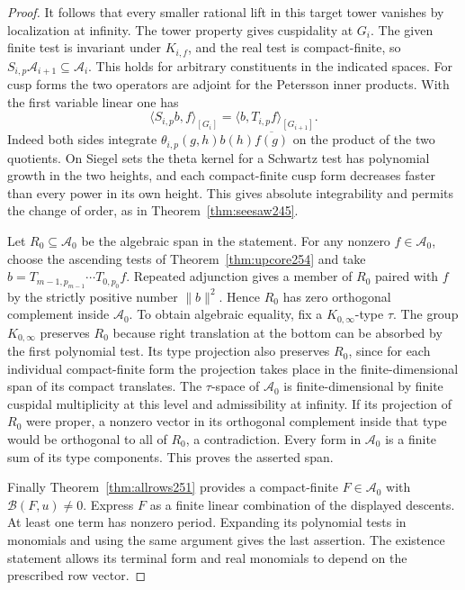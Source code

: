 \documentclass[a4paper,11pt]{article}
\theoremstyle{definition}
\theoremstyle{remark}
\numberwithin{equation}{section}
\begin{document}
\begin{proof}
It follows that every smaller rational lift in this target tower
vanishes by localization at infinity. The tower property gives
cuspidality at \(G_i\). The given finite test is invariant under
\(K_{i,f}\), and the real test is compact-finite, so
\(S_{i,p}\mathcal A_{i+1}\subseteq\mathcal A_i\).
This holds for arbitrary constituents in the indicated spaces.
For cusp forms the two operators are adjoint for the Petersson
inner products. With the first variable linear one has
\[
 \langle S_{i,p} b,f\rangle_{[G_i]}
       =\langle b,T_{i,p} f\rangle_{[G_{i+1}]} .
\]
Indeed both sides integrate
\(\theta_{i,p}(g,h)b(h)\overline{f(g)}\) on the product of the
two quotients. On Siegel sets the theta kernel for a Schwartz
test has polynomial growth in the two heights, and each
compact-finite cusp form decreases faster than every power
in its own height. This gives absolute integrability and
permits the change of order, as in
Theorem~\ref{thm:seesaw245}.

Let \(R_0\subseteq\mathcal A_0\) be the algebraic span in the
statement. For any nonzero \(f\in\mathcal A_0\), choose the
ascending tests of Theorem~\ref{thm:upcore254} and take
\(b=T_{m-1,p_{m-1}}\cdots T_{0,p_0} f\). Repeated adjunction
gives a member of \(R_0\) paired with \(f\) by the strictly
positive number \(\|b\|^2\). Hence \(R_0\) has zero orthogonal
complement inside \(\mathcal A_0\). To obtain algebraic equality,
fix a \(K_{0,\infty}\)-type \(\tau\).
The group \(K_{0,\infty}\) preserves \(R_0\) because right
translation at the bottom can be absorbed by the first polynomial
test. Its type projection also preserves \(R_0\), since for each
individual compact-finite form the projection takes place in the
finite-dimensional span of its compact translates. The
\(\tau\)-space of \(\mathcal A_0\) is finite-dimensional by finite
cuspidal multiplicity at this level and admissibility at infinity.
If its projection of \(R_0\) were proper, a nonzero vector in
its orthogonal complement inside that type would be orthogonal
to all of \(R_0\), a contradiction. Every form in \(\mathcal A_0\)
is a finite sum of its type components. This proves the asserted
span.

Finally Theorem~\ref{thm:allrows251} provides a compact-finite
\(F\in\mathcal A_0\) with \(\mathcal B(F,u)\ne0\). Express \(F\)
as a finite linear combination of the displayed descents. At
least one term has nonzero period. Expanding its polynomial
tests in monomials and using the same argument gives the last
assertion. The existence statement allows its terminal form
and real monomials to depend on the prescribed row vector.
\end{proof}
\end{document}
